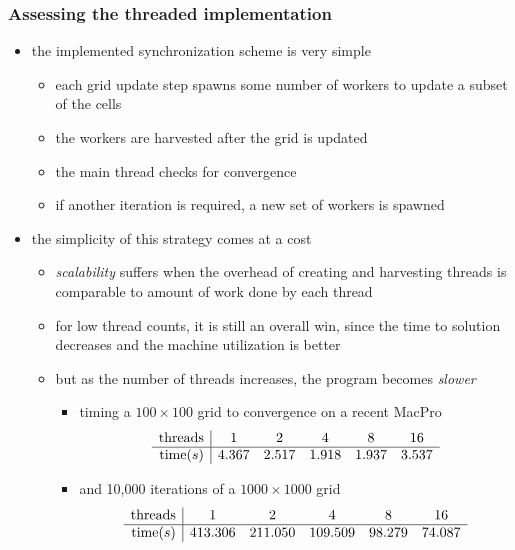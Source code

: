 \begin{frame}[fragile]
%
  \frametitle{Assessing the threaded implementation}
%
  \begin{itemize}
%
  \item the implemented synchronization scheme is very simple
    \begin{itemize}
    \item each grid update step spawns some number of workers to update a subset of the cells
    \item the workers are harvested after the grid is updated
    \item the main thread checks for convergence
    \item if another iteration is required, a new set of workers is spawned
    \end{itemize}
%
  \item the simplicity of this strategy comes at a cost
    \begin{itemize}
    \item {\em scalability} suffers when the overhead of creating and harvesting threads is
      comparable to amount of work done by each thread
    \item for low thread counts, it is still an overall win, since the time to solution
      decreases and the machine utilization is better
    \item but as the number of threads increases, the program becomes {\em slower}
      \begin{itemize}
      \item timing a $100\times100$ grid to convergence on a recent MacPro
%
        \begin{equation*}
          \begin{array}{r|ccccc}
            {\rm threads } & 1 & 2 & 4 & 8 & 16 \\
            \hline 
            {\rm time} (s) & 4.367 & 2.517 & 1.918 & 1.937 & 3.537
% 
          \end{array}
        \end{equation*}
      \item and 10,000 iterations of a $1000\times1000$ grid
        \begin{equation*}
          \begin{array}{r|ccccc}
            {\rm threads } & 1 & 2 & 4 & 8 & 16 \\
            \hline 
            {\rm time} (s) & 413.306 & 211.050 & 109.509 & 98.279 & 74.087
% 
          \end{array}
        \end{equation*}
      \end{itemize}

    \end{itemize}
%
\end{itemize}
%
\end{frame}

